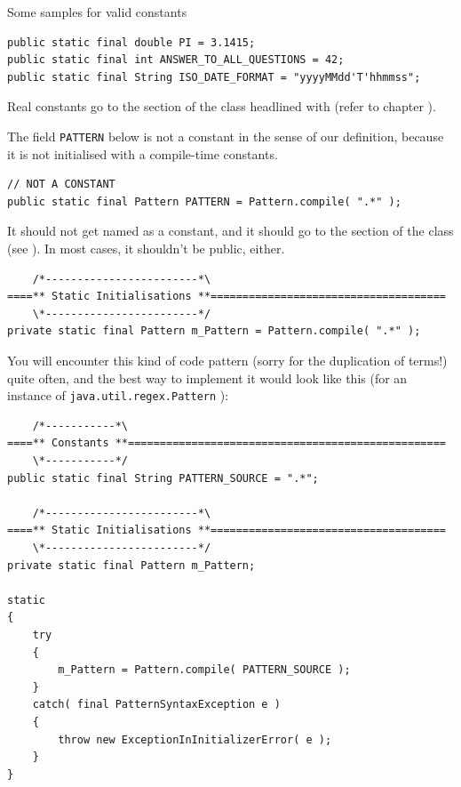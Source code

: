 Some samples for valid constants
\begin{lstlisting}
public static final double PI = 3.1415;
public static final int ANSWER_TO_ALL_QUESTIONS = 42;
public static final String ISO_DATE_FORMAT = "yyyyMMdd'T'hhmmss";
\end{lstlisting}

Real constants go to the section of the class headlined with  (refer to chapter ).

The field \lstinline|PATTERN| below is not a constant in the sense of our definition, because it is not initialised with a compile-time constants.
\begin{lstlisting}
// NOT A CONSTANT
public static final Pattern PATTERN = Pattern.compile( ".*" );
\end{lstlisting}

It should not get named as a constant, and it should go to the  section of the class (see ). In most cases, it shouldn't be public, either.
\begin{lstlisting}
    /*------------------------*\
====** Static Initialisations **=====================================
    \*------------------------*/
private static final Pattern m_Pattern = Pattern.compile( ".*" );
\end{lstlisting}

You will encounter this kind of code pattern (sorry for the duplication of terms!) quite often, and the best way to implement it would look like this (for an instance of \lstinline|java.util.regex.Pattern| \autocite{ORACLE_DOC_PATTERN_CLASS}):

\begin{lstlisting}
    /*-----------*\
====** Constants **==================================================
    \*-----------*/
public static final String PATTERN_SOURCE = ".*";

    /*------------------------*\
====** Static Initialisations **=====================================
    \*------------------------*/
private static final Pattern m_Pattern;

static
{
    try
    {
        m_Pattern = Pattern.compile( PATTERN_SOURCE );
    }
    catch( final PatternSyntaxException e )
    {
        throw new ExceptionInInitializerError( e );
    }    
}
\end{lstlisting}

